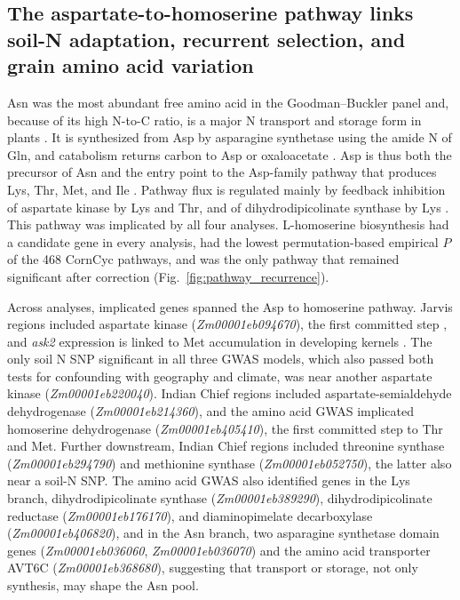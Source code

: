 \subsection{The aspartate-to-homoserine pathway links soil-N adaptation, recurrent selection, and grain amino acid variation}

Asn was the most abundant free amino acid in the Goodman--Buckler panel and, because of its high N-to-C ratio, is a major N transport and storage form in plants \citep{Lea2007Asparagine}. It is synthesized from Asp by asparagine synthetase using the amide N of Gln, and catabolism returns carbon to Asp or oxaloacetate \citep{Lea2007Asparagine}. Asp is thus both the precursor of Asn and the entry point to the Asp-family pathway that produces Lys, Thr, Met, and Ile \citep{Han2021Aspartate, Wang2018AspSeeds, Viola2001AspartatePathway}. Pathway flux is regulated mainly by feedback inhibition of aspartate kinase by Lys and Thr, and of dihydrodipicolinate synthase by Lys \citep{Azevedo2006AspPathway, Jander2009AspArabidopsis}. This pathway was implicated by all four analyses. L-homoserine biosynthesis had a candidate gene in every analysis, had the lowest permutation-based empirical $P$ of the 468 CornCyc pathways, and was the only pathway that remained significant after correction (Fig.~\ref{fig:pathway_recurrence}).

Across analyses, implicated genes spanned the Asp to homoserine pathway. Jarvis regions included aspartate kinase (\textit{Zm00001eb094670}), the first committed step \citep{Viola2001AspartatePathway}, and \textit{ask2} expression is linked to Met accumulation in developing kernels \citep{Duo2026Ask2}. The only soil N SNP significant in all three GWAS models, which also passed both tests for confounding with geography and climate, was near another aspartate kinase (\textit{Zm00001eb220040}). Indian Chief regions included aspartate-semialdehyde dehydrogenase (\textit{Zm00001eb214360}), and the amino acid GWAS implicated homoserine dehydrogenase (\textit{Zm00001eb405410}), the first committed step to Thr and Met. Further downstream, Indian Chief regions included threonine synthase (\textit{Zm00001eb294790}) and methionine synthase (\textit{Zm00001eb052750}), the latter also near a soil-N SNP. The amino acid GWAS also identified genes in the Lys branch, dihydrodipicolinate synthase (\textit{Zm00001eb389290}), dihydrodipicolinate reductase (\textit{Zm00001eb176170}), and diaminopimelate decarboxylase (\textit{Zm00001eb406820}), and in the Asn branch, two asparagine synthetase domain genes (\textit{Zm00001eb036060}, \textit{Zm00001eb036070}) and the amino acid transporter AVT6C (\textit{Zm00001eb368680}), suggesting that transport or storage, not only synthesis, may shape the Asn pool.


